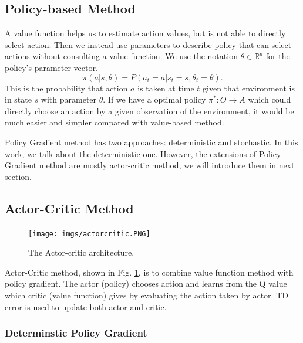\documentclass[11pt,twocolumn]{jarticle} %
\begin{document}
\subsection{Policy-based Method}
A value function helps us to estimate action values, but is not able to directly select action. Then we instead use parameters to describe policy that can select actions without consulting a value function. We use the notation $\theta \in \mathbb{R}^d$ for the policy's parameter vector.
\begin{equation}
\pi(a|s, \theta) = P(a_t = a | s_t = s, \theta_t = \theta). 
\end{equation}
This is the probability that action $a$ is taken at time $t$ given that environment is in state $s$ with parameter $\theta$.
If we have a optimal policy $\pi^*: O \rightarrow A$ which could directly choose an action by a given observation of the environment, it would be much easier and simpler compared with value-based method. \par
Policy Gradient method has two approaches: deterministic and stochastic. In this work, we talk about the deterministic one.
However, the extensions of Policy Gradient method are mostly actor-critic method, we will introduce them in next section. 


\subsection{Actor-Critic Method}
\begin{figure}[h]
 \begin{center}
  \texttt{[image: imgs/actorcritic.PNG]}
  \caption{
  The Actor-critic architecture.
  }
  \label{fig:actorcritic}
 \end{center}
\end{figure}
Actor-Critic method, shown in Fig. \ref{fig:actorcritic}, is to combine value function method with policy gradient. The actor (policy) chooses action and learns from the Q value which critic (value function) gives by evaluating the action taken by actor. TD error is used to update both actor and critic.

\subsubsection{Determinstic Policy Gradient\cite{dpg}}
\end{document}
